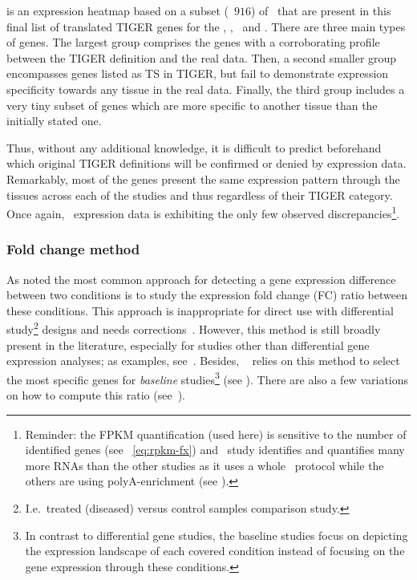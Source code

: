  is an expression heatmap based on
a subset (\ie\ $916$)  of \pcgs\
that are present in this final list of translated \gls{TIGER} genes
for the  \heart, \kidney, \liver\ and \testis.
There are three main types of genes.
The largest group comprises the genes with a corroborating profile
between the \gls{TIGER} definition and the real data.
Then, a second smaller group encompasses genes
listed as \gls{TS} in \gls{TIGER},
but fail to demonstrate expression specificity
towards any tissue in the real data.
Finally, the third group includes a very tiny subset of genes which
are more specific to another tissue than the initially stated one.

Thus, without any additional knowledge,
it is difficult to predict beforehand which original \gls{TIGER} definitions
will be confirmed or denied by expression data.
Remarkably, most of the genes present the same expression pattern
through the tissues across each of the studies
and thus regardless of their \gls{TIGER} category.
Once again, \castle\ expression data is exhibiting
the only few observed discrepancies\footnote{Reminder:
the \gls{FPKM} quantification (used here) is sensitive
to the number of identified genes (see ~\vref{eq:rpkm-fx})
and \castle\ study identifies and quantifies many more \glspl{RNA} than the
other studies as it uses a whole \RNA\ protocol
while the others are using polyA-enrichment (see ).}.

\subsubsection{Fold change method}\label{subsub:TisSpeGeneMethodPerso}
As \citet{DESeq2} noted the most common approach for detecting
a gene expression difference between two conditions is
to study the expression fold change (FC) ratio between these conditions.
This approach is inappropriate for direct use
with differential study\footnote{I.e.\ treated (diseased)
versus control samples comparison study.}
designs and
needs corrections~.
However, this method is still broadly present in the literature,
especially for studies other than differential gene expression analyses;
as examples, see~\citet{Uhlen2015,Zhu2016-xo,Yu2015-uh}.
Besides, \egxa\  relies on this method to select
the most specific genes for \emph{baseline} studies\footnote{In
contrast to differential gene studies,
the baseline studies focus on
depicting the expression landscape of each covered condition
instead of focusing on the gene expression through these conditions.}
(see \Cref{fig:gxaEx}).
There are also a few variations
on how to compute this ratio (see~\citet{Zhu2016-xo,Uhlen2015}).

